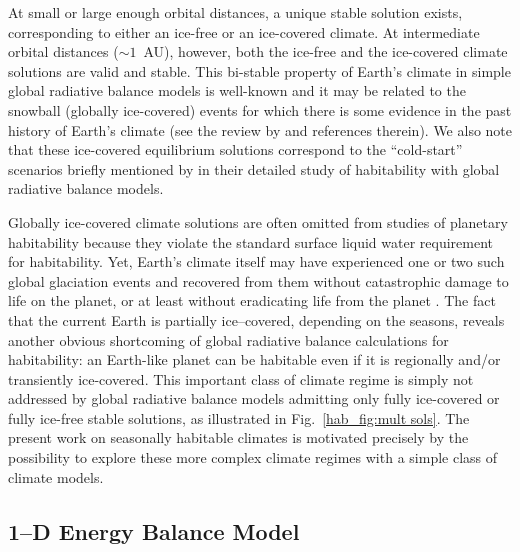 At small or large enough orbital distances, a unique stable solution
exists, corresponding to either an ice-free or an ice-covered
climate. At intermediate orbital distances ($\sim 1$~AU), however,
both the ice-free and the ice-covered climate solutions are valid and
stable. This bi-stable property of Earth's climate in simple global
radiative balance models is well-known and it may be related to the
snowball (globally ice-covered) events for which there is some
evidence in the past history of Earth's climate (see the review by
\citet{hoffman+schrag2002} and references therein). We also note that
these ice-covered equilibrium solutions correspond to the
``cold-start'' scenarios briefly mentioned by
\citet{kasting_et_al1993} in their detailed study of habitability with
global radiative balance models.

Globally ice-covered climate solutions are often omitted from studies
of planetary habitability because they violate the standard surface
liquid water requirement for habitability. Yet, Earth's climate itself
may have experienced one or two such global glaciation events and
recovered from them without catastrophic damage to life on the planet,
or at least without eradicating life from the planet
\citep{hoffman_et_al1998, hoffman+schrag2000, baum+crowley2003,
  hoffman+schrag2002}.  The fact that the current Earth is partially
ice--covered, depending on the seasons, reveals another obvious
shortcoming of global radiative balance calculations for habitability:
an Earth-like planet can be habitable even if it is regionally and/or
transiently ice-covered. This important class of climate regime is
simply not addressed by global radiative balance models admitting only
fully ice-covered or fully ice-free stable solutions, as illustrated
in Fig.~\ref{hab_fig:mult sols}. The present work on seasonally
habitable climates is motivated precisely by the possibility to
explore these more complex climate regimes with a simple class of
climate models.


\subsection{1--D Energy Balance Model}
\label{hab_ssec:EBM}

